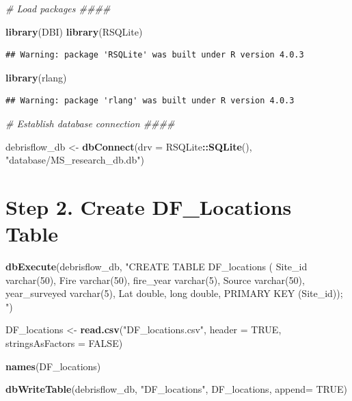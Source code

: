 \documentclass[
]{book}
\newenvironment{Shaded}{\begin{snugshade}}{\end{snugshade}}
\newcommand{\CommentTok}[1]{\textcolor[rgb]{0.56,0.35,0.01}{\textit{#1}}}
\newcommand{\DataTypeTok}[1]{\textcolor[rgb]{0.13,0.29,0.53}{#1}}
\newcommand{\KeywordTok}[1]{\textcolor[rgb]{0.13,0.29,0.53}{\textbf{#1}}}
\newcommand{\NormalTok}[1]{#1}
\newcommand{\OperatorTok}[1]{\textcolor[rgb]{0.81,0.36,0.00}{\textbf{#1}}}
\newcommand{\OtherTok}[1]{\textcolor[rgb]{0.56,0.35,0.01}{#1}}
\newcommand{\StringTok}[1]{\textcolor[rgb]{0.31,0.60,0.02}{#1}}
\begin{document}
\begin{Shaded}
\begin{Highlighting}[]
\CommentTok{# Load packages ####}

\KeywordTok{library}\NormalTok{(DBI)}
\KeywordTok{library}\NormalTok{(RSQLite)}
\end{Highlighting}
\end{Shaded}

\begin{verbatim}
## Warning: package 'RSQLite' was built under R version 4.0.3
\end{verbatim}

\begin{Shaded}
\begin{Highlighting}[]
\KeywordTok{library}\NormalTok{(rlang)}
\end{Highlighting}
\end{Shaded}

\begin{verbatim}
## Warning: package 'rlang' was built under R version 4.0.3
\end{verbatim}

\begin{Shaded}
\begin{Highlighting}[]
\CommentTok{# Establish database connection ####}

\NormalTok{debrisflow_db <-}\StringTok{ }\KeywordTok{dbConnect}\NormalTok{(}\DataTypeTok{drv =}\NormalTok{ RSQLite}\OperatorTok{::}\KeywordTok{SQLite}\NormalTok{(), }\StringTok{"database/MS_research_db.db"}\NormalTok{)}
\end{Highlighting}
\end{Shaded}

\hypertarget{step-2.-create-df_locations-table}{%
\section{Step 2. Create DF\_Locations Table}\label{step-2.-create-df_locations-table}}

\begin{Shaded}
\begin{Highlighting}[]
\KeywordTok{dbExecute}\NormalTok{(debrisflow_db, }\StringTok{"CREATE TABLE DF_locations (}
\StringTok{          Site_id varchar(50),}
\StringTok{          Fire varchar(50),}
\StringTok{          fire_year varchar(5),}
\StringTok{          Source varchar(50),}
\StringTok{          year_surveyed varchar(5),}
\StringTok{          Lat double,}
\StringTok{          long double, PRIMARY KEY (Site_id));}
\StringTok{          "}\NormalTok{)}

\NormalTok{DF_locations <-}\StringTok{ }\KeywordTok{read.csv}\NormalTok{(}\StringTok{"DF_locations.csv"}\NormalTok{, }\DataTypeTok{header =} \OtherTok{TRUE}\NormalTok{, }\DataTypeTok{stringsAsFactors =} \OtherTok{FALSE}\NormalTok{)}

\KeywordTok{names}\NormalTok{(DF_locations)}

\KeywordTok{dbWriteTable}\NormalTok{(debrisflow_db, }\StringTok{"DF_locations"}\NormalTok{, DF_locations, }\DataTypeTok{append=} \OtherTok{TRUE}\NormalTok{)}
\end{Highlighting}
\end{Shaded}
\end{document}
